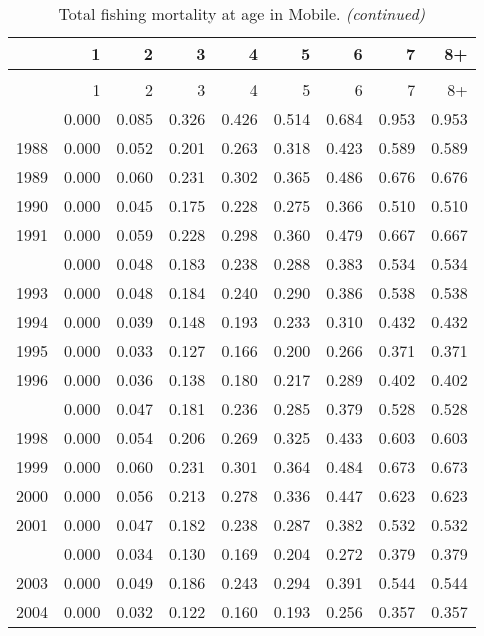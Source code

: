 \documentclass[
]{article}
\begin{document}
\begin{longtable}[t]{lrrrrrrrr}
\caption{\label{tab:Mobile-fleet-FAA-table}Total fishing mortality at age in Mobile.}\\
\toprule
  & 1 & 2 & 3 & 4 & 5 & 6 & 7 & 8+\\
\midrule
\endfirsthead
\caption[]{Total fishing mortality at age in Mobile. \textit{(continued)}}\\
\toprule
  & 1 & 2 & 3 & 4 & 5 & 6 & 7 & 8+\\
\midrule
\endhead

\endfoot
\bottomrule
\endlastfoot
1987 & 0.000 & 0.085 & 0.326 & 0.426 & 0.514 & 0.684 & 0.953 & 0.953\\
1988 & 0.000 & 0.052 & 0.201 & 0.263 & 0.318 & 0.423 & 0.589 & 0.589\\
1989 & 0.000 & 0.060 & 0.231 & 0.302 & 0.365 & 0.486 & 0.676 & 0.676\\
1990 & 0.000 & 0.045 & 0.175 & 0.228 & 0.275 & 0.366 & 0.510 & 0.510\\
1991 & 0.000 & 0.059 & 0.228 & 0.298 & 0.360 & 0.479 & 0.667 & 0.667\\
\addlinespace
1992 & 0.000 & 0.048 & 0.183 & 0.238 & 0.288 & 0.383 & 0.534 & 0.534\\
1993 & 0.000 & 0.048 & 0.184 & 0.240 & 0.290 & 0.386 & 0.538 & 0.538\\
1994 & 0.000 & 0.039 & 0.148 & 0.193 & 0.233 & 0.310 & 0.432 & 0.432\\
1995 & 0.000 & 0.033 & 0.127 & 0.166 & 0.200 & 0.266 & 0.371 & 0.371\\
1996 & 0.000 & 0.036 & 0.138 & 0.180 & 0.217 & 0.289 & 0.402 & 0.402\\
\addlinespace
1997 & 0.000 & 0.047 & 0.181 & 0.236 & 0.285 & 0.379 & 0.528 & 0.528\\
1998 & 0.000 & 0.054 & 0.206 & 0.269 & 0.325 & 0.433 & 0.603 & 0.603\\
1999 & 0.000 & 0.060 & 0.231 & 0.301 & 0.364 & 0.484 & 0.673 & 0.673\\
2000 & 0.000 & 0.056 & 0.213 & 0.278 & 0.336 & 0.447 & 0.623 & 0.623\\
2001 & 0.000 & 0.047 & 0.182 & 0.238 & 0.287 & 0.382 & 0.532 & 0.532\\
\addlinespace
2002 & 0.000 & 0.034 & 0.130 & 0.169 & 0.204 & 0.272 & 0.379 & 0.379\\
2003 & 0.000 & 0.049 & 0.186 & 0.243 & 0.294 & 0.391 & 0.544 & 0.544\\
2004 & 0.000 & 0.032 & 0.122 & 0.160 & 0.193 & 0.256 & 0.357 & 0.357\\

\end{longtable}
\end{document}

